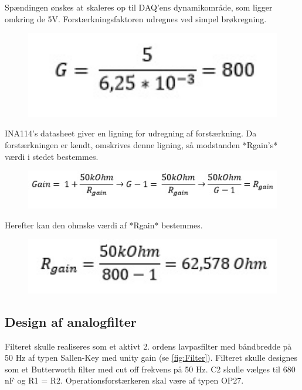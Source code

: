 Spændingen ønskes at skaleres op til DAQ’ens dynamikområde, som ligger omkring de 5V. Forstærkningsfaktoren udregnes ved simpel brøkregning. \\

\begin{figure}[h]
	\centering
	\includegraphics[width=1\textwidth]{Figurer/ligningtilgain}
\end{figure}

INA114’s datasheet giver en ligning for udregning af forstærkning. Da forstærkningen er kendt, omskrives denne ligning, så modstanden *Rgain’s* værdi i stedet bestemmes.\\

\begin{figure}[h]
	\centering
	\includegraphics[width=1\textwidth]{Figurer/omskrivningtilgain}
\end{figure}

Herefter kan den ohmske værdi af *Rgain* bestemmes.\\

\begin{figure}[h]
	\centering
	\includegraphics[width=1\textwidth]{Figurer/udregningafgain}
\end{figure}

\subsection{Design af analogfilter}
Filteret skulle realiseres som et aktivt 2. ordens lavpasfilter med båndbredde på 50 Hz af typen Sallen-Key med unity gain (se \ref{fig:Filter}). Filteret skulle designes som et Butterworth filter med cut off frekvens på 50 Hz. C2 skulle vælges til 680 nF og R1 = R2. Operationsforstærkeren skal være af typen OP27.  

